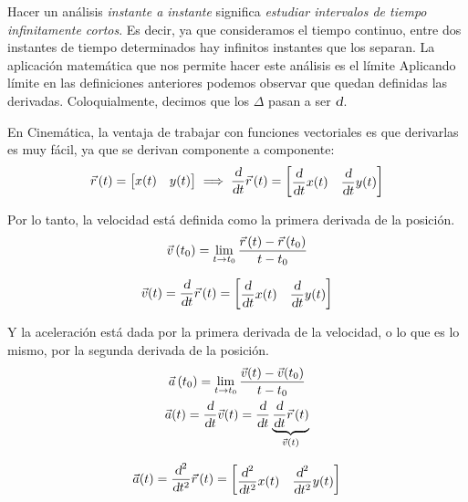 Hacer un análisis \emph{instante a instante} significa \emph{estudiar intervalos de tiempo infinitamente cortos}.
Es decir, ya que consideramos el tiempo continuo, entre dos instantes de tiempo determinados hay infinitos instantes que los separan.
La aplicación matemática que nos permite hacer este análisis es el límite
Aplicando límite en las definiciones anteriores podemos observar que quedan definidas las derivadas.
Coloquialmente, decimos que los $\Delta$ pasan a ser $\textsl{d}$.

En Cinemática, la ventaja de trabajar con funciones vectoriales es que derivarlas es muy fácil, ya que se derivan componente a componente:
\[
  \vec{r}\hspace{0.05cm} (t) = \begin{bmatrix} x(t) & y(t) \end{bmatrix} \implies
  \dfrac{\textsl{d}}{\textsl{d} t} \vec{r}\hspace{0.05cm} (t) =
  \begin{bmatrix} \dfrac{\textsl{d}}{\textsl{d} t} x(t) & \dfrac{\textsl{d}}{\textsl{d} t} y(t) \end{bmatrix}
\]

Por lo tanto, la velocidad está definida como la primera derivada de la posición.
\begin{equation*}
    \Vec{v}\left(t_0\right) = \lim_{t \to t_0} \dfrac{\vec{r}\hspace{0.05cm}(t)-\vec{r}\hspace{0.05cm}(t_0)}{t-t_0}
\end{equation*}

\begin{mdframed}[style=DefinitionFrame]
    \begin{defn}
    \end{defn}
    \begin{equation*}
        \Vec{v}(t) = \dfrac{\textsl{d}}{\textsl{d} t} \vec{r}\hspace{0.05cm} (t) = { \begin{bmatrix} \dfrac{\textsl{d}}{\textsl{d} t} x(t) & \dfrac{\textsl{d}}{\textsl{d} t} y(t) \end{bmatrix} }
    \end{equation*}
\end{mdframed}

Y la aceleración está dada por la primera derivada de la velocidad, o lo que es lo mismo, por la segunda derivada de la posición.
\begin{gather*}
    \Vec{a}\left(t_0\right) = \lim_{t \to t_0} \dfrac{\Vec{v}(t)-\Vec{v}(t_0)}{t-t_0}
    \\
    \Vec{a}(t) =
    \dfrac{\textsl{d}}{\textsl{d} t} \Vec{v} (t) =
    \dfrac{\textsl{d}}{\textsl{d} t} \underbrace{\dfrac{\textsl{d}}{\textsl{d} t} \vec{r}\hspace{0.05cm} (t)}_{\Vec{v}(t)}
\end{gather*}

\begin{mdframed}[style=DefinitionFrame]
    \begin{defn}
    \end{defn}
    \begin{equation*}
        \Vec{a}(t) =
        \dfrac{\textsl{d}^2}{\textsl{d} t^2} \vec{r}\hspace{0.05cm} (t) =
        \begin{bmatrix}
            \dfrac{\textsl{d}^2}{\textsl{d} t^2} x(t) & \dfrac{\textsl{d}^2}{\textsl{d} t^2} y(t)
        \end{bmatrix}
    \end{equation*}
\end{mdframed}

